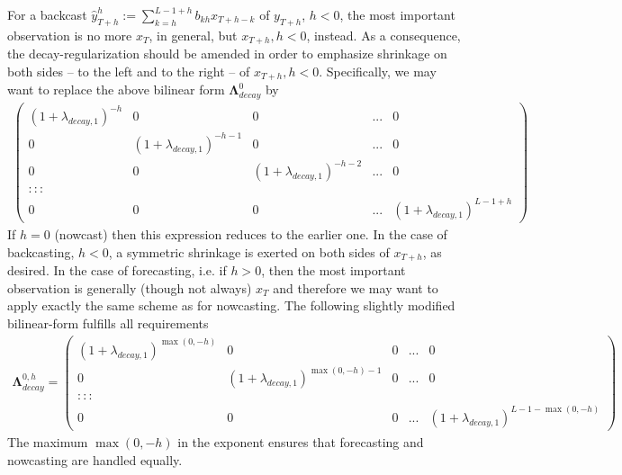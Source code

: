 \documentclass[a4paper]{book}
\begin{document}
For a backcast $\hat{y}_{T+h}^{h}:=\sum_{k=h}^{L-1+h}b_{kh}x_{T+h-k}$ of $y_{T+h}$, $h<0$, the most important observation is no more $x_T$, in general, but $x_{T+h},h<0$, instead. As a consequence, the decay-regularization should be amended in order to emphasize shrinkage on both sides -- to the left and to the right -- of $x_{T+h},h<0$. Specifically, we may want to replace the above bilinear form $\boldsymbol{\Lambda}_{decay}^0$ by
\begin{eqnarray*}
\left(\begin{array}{ccccc}(1+\lambda_{decay,1})^{-h}&0&0&...&0\\
                                              0&(1+\lambda_{decay,1})^{-h-1}&0&...&0\\
                                              0&0&(1+\lambda_{decay,1})^{-h-2}&...&0\\
                                              :::\\
                                              0&0&0&...&(1+\lambda_{decay,1})^{L-1+h}                                              
                                              \end{array}\right)
\end{eqnarray*}
If $h=0$ (nowcast) then this expression reduces to the earlier one. In the case of backcasting, $h<0$, a symmetric shrinkage is exerted on both sides of $x_{T+h}$, as desired. 
In the case of forecasting, i.e. if $h>0$, then the most important observation is generally (though not always) $x_T$ and therefore we may want to apply exactly the same scheme as for nowcasting. The following slightly modified bilinear-form fulfills all requirements
\begin{eqnarray}\label{fo_bac_now-block}
\boldsymbol{\Lambda}_{decay}^{0,h}=\left(\begin{array}{ccccc}(1+\lambda_{decay,1})^{\max(0,-h)}&0&0&...&0\\
                                              0&(1+\lambda_{decay,1})^{\max(0,-h)-1}&0&...&0\\
:::\\
                                              0&0&0&...&(1+\lambda_{decay,1})^{L-1-\max(0,-h)}                                              
                                              \end{array}\right)
\end{eqnarray}
The maximum $\max(0,-h)$ in the exponent ensures that forecasting and nowcasting are handled equally. 
\end{document}
